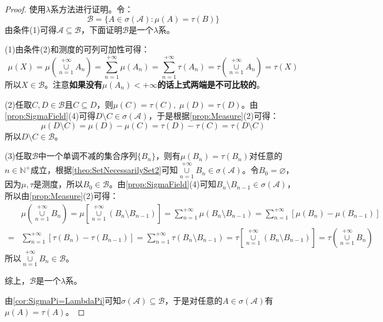 \begin{proof}
	使用$\lambda$系方法进行证明。令：
	\begin{equation*}
		\mathscr{B}=\{A\in\sigma(\mathscr{A}):\mu(A)=\tau(B)\}
	\end{equation*}
	由条件(1)可得$\mathscr{A}\subseteq\mathscr{B}$，下面证明$\mathscr{B}$是一个$\lambda$系。\par
	(1)由条件(2)和测度的可列可加性可得：
	\begin{equation*}
		\mu(X)=\mu\left(\underset{n=1}{\overset{+\infty}{\cup}}A_n\right)=\sum_{n=1}^{+\infty}\mu(A_n)=\sum_{n=1}^{+\infty}\tau(A_n)=\tau\left(\underset{n=1}{\overset{+\infty}{\cup}}A_n\right)=\tau(X)
	\end{equation*}
	所以$X\in\mathscr{B}$。注意\textbf{如果没有$\mu(A_n)<+\infty$的话上式两端是不可比较的}。\par
	(2)任取$C,D\in\mathscr{B}$且$C\subseteq D$，则$\mu(C)=\tau(C),\;\mu(D)=\tau(D)$。由\cref{prop:SigmaField}(4)可得$D\setminus C\in\sigma(\mathscr{A})$，于是根据\cref{prop:Measure}(2)可得：
	\begin{equation*}
		\mu(D\setminus C)=\mu(D)-\mu(C)=\tau(D)-\tau(C)=\tau(D\setminus C)
	\end{equation*}
	所以$D\setminus C\in\mathscr{B}$。\par
	(3)任取$\mathscr{B}$中一个单调不减的集合序列$\{B_n\}$，则有$\mu(B_n)=\tau(B_n)$对任意的$n\in\mathbb{N}^+$成立，根据\cref{theo:SetNecessarilySet2}可知$\underset{n=1}{\overset{+\infty}{\cup}}B_n\in\sigma(\mathscr{A})$。令$B_0=\varnothing$，因为$\mu,\tau$是测度，所以$B_0\in\mathscr{B}$。由\cref{prop:SigmaField}(4)可知$B_n\setminus B_{n-1}\in\sigma(\mathscr{A})$，所以由\cref{prop:Measure}(2)可得：
	\begin{align*}
		&\mu\left(\underset{n=1}{\overset{+\infty}{\cup}}B_n\right)=\mu\left[\underset{n=1}{\overset{+\infty}{\cup}}(B_n\setminus B_{n-1})\right]=\sum_{n=1}^{+\infty}\mu(B_n\setminus B_{n-1})=\sum_{n=1}^{+\infty}[\mu(B_n)-\mu(B_{n-1})] \\
		=&\sum_{n=1}^{+\infty}[\tau(B_n)-\tau(B_{n-1})]=\sum_{n=1}^{+\infty}\tau(B_n\setminus B_{n-1})=\tau\left[\underset{n=1}{\overset{+\infty}{\cup}}(B_n\setminus B_{n-1})\right]=\tau\left(\underset{n=1}{\overset{+\infty}{\cup}}B_n\right)
	\end{align*}
	所以$\underset{n=1}{\overset{+\infty}{\cup}}B_n\in\mathscr{B}$。\par
	综上，$\mathscr{B}$是一个$\lambda$系。\par
	由\cref{cor:SigmaPi=LambdaPi}可知$\sigma(\mathscr{A})\subseteq\mathscr{B}$，于是对任意的$A\in\sigma(\mathscr{A})$有$\mu(A)=\tau(A)$。
\end{proof}
